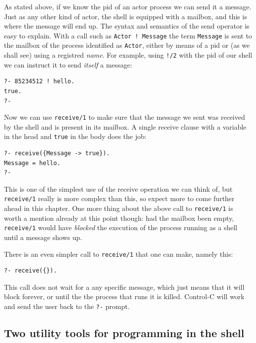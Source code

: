 As stated above, if we know the pid of an actor process we can send it a message. Just as any other kind of actor, the shell is equipped with a mailbox, and this is where the message will end up. The syntax and semantics of the send operator is easy to explain. With a call such as \texttt{Actor\,!\,Message} the term \texttt{Message} is sent to the mailbox of the process identified as \texttt{Actor}, either by means of a pid or (as we shall see) using a registred \textit{name}. For example, using \texttt{!/2} with the pid of our shell we can instruct it to send \textit{itself} a message:

\begin{verbatim}
?- 85234512 ! hello.
true.
?-
\end{verbatim}

\noindent Now we can use \texttt{receive/1} to make sure that the message we sent was received by the shell and is present in its mailbox. A single receive clause with a variable in the head and \texttt{true} in the body does the job:

\begin{verbatim}
?- receive({Message -> true}).
Message = hello.
?-
\end{verbatim}

\noindent This is one of the simplest use of the receive operation we can think of, but \texttt{receive/1} really is more complex than this, so expect more to come further ahead in this chapter. One more thing about the above call to \texttt{receive/1} is worth a mention already at this point though: had the mailbox been empty, \texttt{receive/1} would have \textit{blocked} the execution of the process running as a shell until a message shows up.

There is an even simpler call to \texttt{receive/1} that one can make, namely this:

\begin{verbatim}
?- receive({}).
\end{verbatim}

\noindent This call does not wait for a any specific message, which just means that it will block forever, or until the the process that runs it is killed. Control-C will work and send the user back to the \texttt{?-} prompt.

\subsection{Two utility tools for programming in the shell}


